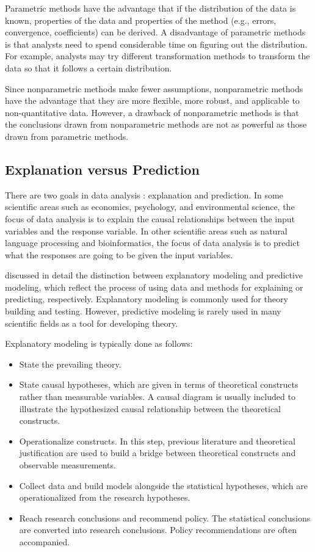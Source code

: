 \documentclass[]{book}
\theoremstyle{definition}
\theoremstyle{definition}
\theoremstyle{definition}
\theoremstyle{remark}
\begin{document}
Parametric methods have the advantage that if the distribution of the
data is known, properties of the data and properties of the method
(e.g., errors, convergence, coefficients) can be derived. A disadvantage
of parametric methods is that analysts need to spend considerable time
on figuring out the distribution. For example, analysts may try
different transformation methods to transform the data so that it
follows a certain distribution.

Since nonparametric methods make fewer assumptions, nonparametric
methods have the advantage that they are more flexible, more robust, and
applicable to non-quantitative data. However, a drawback of
nonparametric methods is that the conclusions drawn from nonparametric
methods are not as powerful as those drawn from parametric methods.

\subsection{Explanation versus Prediction}\label{S:expred}

There are two goals in data analysis
\citep{breiman2001modeling, shmueli2010model}: explanation and
prediction. In some scientific areas such as economics, psychology, and
environmental science, the focus of data analysis is to explain the
causal relationships between the input variables and the response
variable. In other scientific areas such as natural language processing
and bioinformatics, the focus of data analysis is to predict what the
responses are going to be given the input variables.

\citet{shmueli2010model} discussed in detail the distinction between
explanatory modeling and predictive modeling, which reflect the process
of using data and methods for explaining or predicting, respectively.
Explanatory modeling is commonly used for theory building and testing.
However, predictive modeling is rarely used in many scientific fields as
a tool for developing theory.

Explanatory modeling is typically done as follows:

\begin{itemize}
\item
  State the prevailing theory.
\item
  State causal hypotheses, which are given in terms of theoretical
  constructs rather than measurable variables. A causal diagram is
  usually included to illustrate the hypothesized causal relationship
  between the theoretical constructs.
\item
  Operationalize constructs. In this step, previous literature and
  theoretical justification are used to build a bridge between
  theoretical constructs and observable measurements.
\item
  Collect data and build models alongside the statistical hypotheses,
  which are operationalized from the research hypotheses.
\item
  Reach research conclusions and recommend policy. The statistical
  conclusions are converted into research conclusions. Policy
  recommendations are often accompanied.
\end{itemize}
\end{document}
